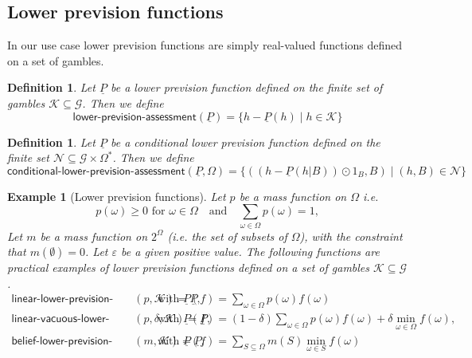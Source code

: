 \documentclass{article}
\theoremstyle{mytheorem}
\newtheorem{definition}[theorem]{Definition}
\newtheorem{example}[theorem]{Example}
\newcommand{\func}[1]{\ensuremath{\textsf{#1}}} %
\newcommand{\set}[1]{\ensuremath{\{ #1 \} }} %
\begin{document}
\subsection{Lower prevision functions} \label{sec:lower-prevision-functions}
In our use case lower prevision functions are simply real-valued functions defined on a set of gambles.

\begin{definition}
Let $\underline{P}$ be a lower prevision function defined on the finite set of gambles $\mathcal{K} \subseteq \mathcal{G}$.
Then we define
\[
  \func{lower-prevision-assessment}(\underline{P}) = \set{ h - \underline{P}(h) \mid h \in \mathcal{K}}
\]
\end{definition}

\begin{definition}
Let $\underline{P}$ be a conditional lower prevision function defined on the finite set $\mathcal{N} \subseteq \mathcal{G} \times \Omega^\ast$. Then we define
\[
  \func{conditional-lower-prevision-assessment}(\underline{P}, \Omega) = 
  \set{ ((h - \underline{P}(h|B))\odot 1_B, B) \mid (h, B) \in \mathcal{N} }
\]
\end{definition}

\begin{example}[Lower prevision functions]
Let $p$ be a mass function on $\Omega$ i.e.
\[
   p(\omega) \geq 0 \text{ for } \omega \in \Omega \quad \text{and} \quad \sum_{\omega \in \Omega} p(\omega) = 1,
\]
Let $m$ be a mass function on $2^\Omega$ (i.e. the set of subsets of $\Omega$), with the constraint that $m(\emptyset)=0$.
Let $\varepsilon$ be a given positive value. The following functions are practical examples of lower prevision functions defined on a set of gambles $\mathcal{K} \subseteq \mathcal{G}$.
\begin{align}
  \func{linear-lower-prevision-function}(p,\mathcal{K}) = \underline{P}, & \quad \text{ with } \underline{P}(f) = \sum_{\omega \in \Omega} p(\omega) f(\omega)
  \label{eq:linear-lower-prevision-function}
  \\
  \func{linear-vacuous-lower-prevision-function}(p,\delta,\mathcal{K}) = \underline{P},
  & \quad \text{ with } \underline{P}(f) = 
  (1 - \delta) \sum_{\omega \in \Omega} p(\omega) f(\omega)
  + \delta \min_{\omega \in \Omega} f(\omega),
  \label{eq:linear-vacuous-lower-prevision-function}
  \\
  \func{belief-lower-prevision-function}(m,\mathcal{K}) = \underline{P},
  & \quad \text{ with } \underline{P}(f) = 
    \sum_{S \subseteq \Omega} m(S) \min_{\omega \in S} f(\omega)
  \label{eq:belief-lower-prevision-function}
\end{align}
\end{example}
\end{document}
